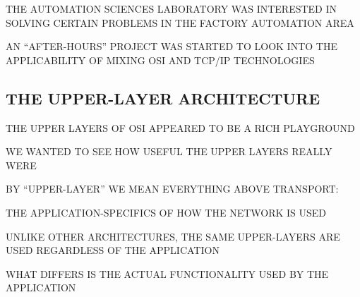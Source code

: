\begin{bwslide}

\begin{nrtc}
\item	THE AUTOMATION SCIENCES LABORATORY WAS INTERESTED IN SOLVING CERTAIN
	PROBLEMS IN THE FACTORY AUTOMATION AREA

\item	AN ``AFTER-HOURS'' PROJECT WAS STARTED TO LOOK INTO THE APPLICABILITY
	OF MIXING OSI AND TCP/IP TECHNOLOGIES
\end{nrtc}
\end{bwslide}




\begin{bwslide}
\part*	{THE UPPER-LAYER ARCHITECTURE}\bf

\begin{nrtc}
\item	THE UPPER LAYERS OF OSI APPEARED TO BE A RICH PLAYGROUND

\item	WE WANTED TO SEE HOW USEFUL THE UPPER LAYERS REALLY WERE
\end{nrtc}
\end{bwslide}


\begin{bwslide}

\begin{nrtc}
\item	BY ``UPPER-LAYER'' WE MEAN EVERYTHING ABOVE TRANSPORT:
    \begin{nrtc}
    \item	THE APPLICATION-SPECIFICS OF HOW THE NETWORK IS USED
    \end{nrtc}

\item	UNLIKE OTHER ARCHITECTURES, THE SAME UPPER-LAYERS ARE USED
	REGARDLESS OF THE APPLICATION

\item	WHAT DIFFERS IS THE ACTUAL FUNCTIONALITY USED BY THE APPLICATION
\end{nrtc}
\end{bwslide}


